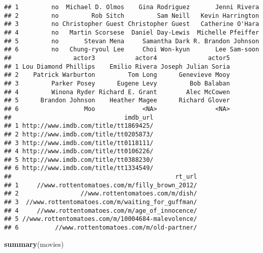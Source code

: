 \documentclass[]{article}
\newenvironment{Shaded}{\begin{snugshade}}{\end{snugshade}}
\newcommand{\KeywordTok}[1]{\textcolor[rgb]{0.13,0.29,0.53}{\textbf{#1}}}
\newcommand{\NormalTok}[1]{#1}
\begin{document}
\begin{verbatim}
## 1         no  Michael D. Olmos    Gina Rodriguez       Jenni Rivera
## 2         no         Rob Sitch         Sam Neill   Kevin Harrington
## 3         no Christopher Guest Christopher Guest   Catherine O'Hara
## 4         no   Martin Scorsese  Daniel Day-Lewis  Michelle Pfeiffer
## 5         no       Stevan Mena     Samantha Dark R. Brandon Johnson
## 6         no   Chung-ryoul Lee     Choi Won-kyun       Lee Sam-soon
##                 actor3           actor4              actor5
## 1 Lou Diamond Phillips    Emilio Rivera Joseph Julian Soria
## 2    Patrick Warburton         Tom Long      Genevieve Mooy
## 3         Parker Posey      Eugene Levy         Bob Balaban
## 4         Winona Ryder Richard E. Grant        Alec McCowen
## 5      Brandon Johnson    Heather Magee      Richard Glover
## 6                  Moo             <NA>                <NA>
##                               imdb_url
## 1 http://www.imdb.com/title/tt1869425/
## 2 http://www.imdb.com/title/tt0205873/
## 3 http://www.imdb.com/title/tt0118111/
## 4 http://www.imdb.com/title/tt0106226/
## 5 http://www.imdb.com/title/tt0388230/
## 6 http://www.imdb.com/title/tt1334549/
##                                             rt_url
## 1     //www.rottentomatoes.com/m/filly_brown_2012/
## 2                 //www.rottentomatoes.com/m/dish/
## 3  //www.rottentomatoes.com/m/waiting_for_guffman/
## 4     //www.rottentomatoes.com/m/age_of_innocence/
## 5 //www.rottentomatoes.com/m/10004684-malevolence/
## 6          //www.rottentomatoes.com/m/old-partner/
\end{verbatim}

\begin{Shaded}
\begin{Highlighting}[]
\KeywordTok{summary}\NormalTok{(movies)}
\end{Highlighting}
\end{Shaded}
\end{document}
